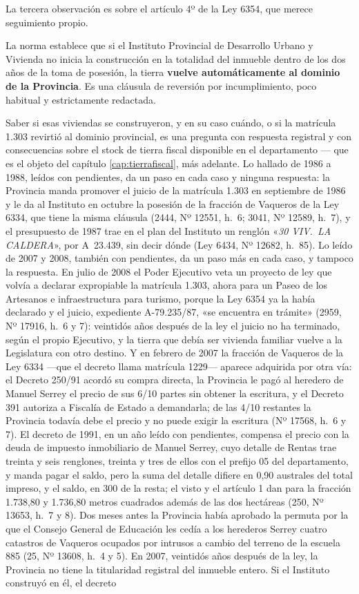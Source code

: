 La tercera observación es sobre el artículo 4º de la Ley 6354, que merece seguimiento propio.

La norma establece que si el Instituto Provincial de Desarrollo Urbano y Vivienda no inicia la construcción en la totalidad del inmueble dentro de los dos años de la toma de posesión, la tierra \textbf{vuelve automáticamente al dominio de la Provincia}. Es una cláusula de reversión por incumplimiento, poco habitual y estrictamente redactada.

Saber si esas viviendas se construyeron, y en su caso cuándo, o si la matrícula 1.303 revirtió al dominio provincial, es una pregunta con respuesta registral y con consecuencias sobre el stock de tierra fiscal disponible en el departamento --- que es el objeto del capítulo \ref{cap:tierrafiscal}, más adelante. Lo hallado de 1986 a 1988, leídos con pendientes, da un paso en cada caso y ninguna respuesta: la Provincia manda promover el juicio de la matrícula 1.303 en septiembre de 1986 y le da al Instituto en octubre la posesión de la fracción de Vaqueros de la Ley 6334, que tiene la misma cláusula (2444, Nº 12551, h.\ 6; 3041, Nº 12589, h.\ 7), y el presupuesto de 1987 trae en el plan del Instituto un renglón «\textit{30 VIV.\ LA CALDERA}», por A~23.439, sin decir dónde (Ley 6434, Nº 12682, h.\ 85). Lo leído de 2007 y 2008, también con pendientes, da un paso más en cada caso, y tampoco la respuesta. En julio de 2008 el Poder Ejecutivo veta un proyecto de ley que volvía a declarar expropiable la matrícula 1.303, ahora para un Paseo de los Artesanos e infraestructura para turismo, porque la Ley 6354 ya la había declarado y el juicio, expediente A-79.235/87, «se encuentra en trámite» (2959, Nº 17916, h.\ 6 y 7): veintidós años después de la ley el juicio no ha terminado, según el propio Ejecutivo, y la tierra que debía ser vivienda familiar vuelve a la Legislatura con otro destino. Y en febrero de 2007 la fracción de Vaqueros de la Ley 6334 ---que el decreto llama matrícula 1229--- aparece adquirida por otra vía: el Decreto 250/91 acordó su compra directa, la Provincia le pagó al heredero de Manuel Serrey el precio de sus 6/10 partes sin obtener la escritura, y el Decreto 391 autoriza a Fiscalía de Estado a demandarla; de las 4/10 restantes la Provincia todavía debe el precio y no puede exigir la escritura (Nº 17568, h.\ 6 y 7). El decreto de 1991, en un año leído con pendientes, compensa el precio con la deuda de impuesto inmobiliario de Manuel Serrey, cuyo detalle de Rentas trae treinta y seis renglones, treinta y tres de ellos con el prefijo 05 del departamento, y manda pagar el saldo, pero la suma del detalle difiere en 0,90 australes del total impreso, y el saldo, en 300 de la resta; el visto y el artículo 1 dan para la fracción 1.738,80 y 1.736,80 metros cuadrados además de las dos hectáreas (250, Nº 13653, h.\ 7 y 8). Dos meses antes la Provincia había aprobado la permuta por la que el Consejo General de Educación les cedía a los herederos Serrey cuatro catastros de Vaqueros ocupados por intrusos a cambio del terreno de la escuela 885 (25, Nº 13608, h.\ 4 y 5). En 2007, veintidós años después de la ley, la Provincia no tiene la titularidad registral del inmueble entero. Si el Instituto construyó en él, el decreto 